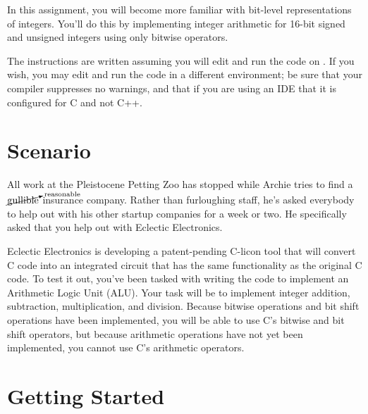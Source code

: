 

\usepackage{cancel}

\renewcommand{\labnumber}{3}
\renewcommand{\labname}{Integer Representation and Arithmetic Lab}
\renewcommand{\shortlabname}{integerlab}
\renewcommand{\collaborationrules}{\individualeffort}
\renewcommand{\duedate}{Week of September 20, before the start of your lab section}
\startdocument




In this assignment, you will become more familiar with bit-level
representations of integers.  You'll do this by implementing integer arithmetic
for 16-bit signed and unsigned integers using only bitwise operators.

The instructions are written assuming you will edit and run the code on
\runtimeenvironment. If you wish, you may edit and run the code
in a different environment; be sure that your compiler suppresses no warnings,
and that if you are using an IDE that it is configured for C and not C++.

\section{Scenario}

All work at the Pleistocene Petting Zoo has stopped while Archie tries to find
a $\cancelto{\mathrm{reasonable}}{\mathrm{gullible}}$ insurance company. Rather
than furloughing staff, he's asked everybody to help out with his other startup
companies for a week or two. He specifically asked that you help out with
Eclectic Electronics.

Eclectic Electronics is developing a patent-pending C-licon tool that will
convert C code into an integrated circuit that has the same functionality as
the original C code. To test it out, you've been tasked with writing the code
to implement an Arithmetic Logic Unit (ALU). Your task will be to implement
integer addition, subtraction, multiplication, and division. Because bitwise
operations and bit shift operations have been implemented, you will be able to
use C's bitwise and bit shift operators, but because arithmetic operations have
not yet been implemented, you cannot use C's arithmetic operators.

\section{Getting Started}

